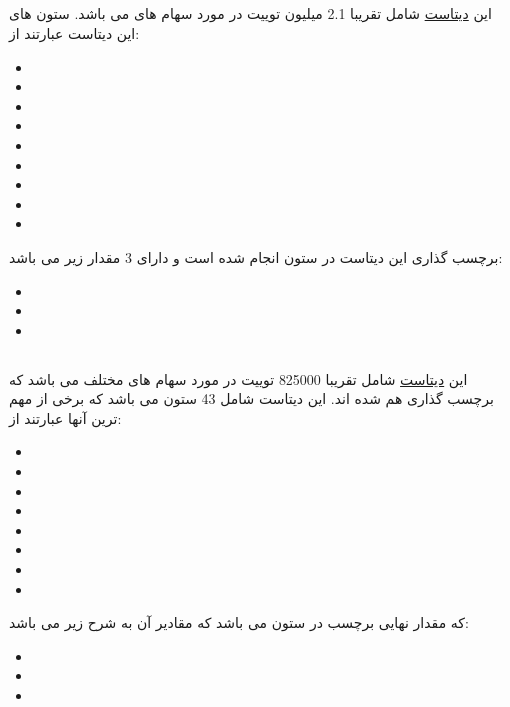 {	\subsection{}
	{
		این \href{https://www.kaggle.com/datasets/andreaskonradsen/stocks-with-sentiment-and-emotion-analysis}{دیتاست} 
		شامل تقریبا 2.1 میلیون توییت در مورد سهام های 
		می باشد.
		\newline ستون های این دیتاست عبارتند از:
		\begin{itemize}
			\item {}
			\item {}
			\item {}
			\item {}
			\item {}
			\item {}
			\item {}
			\item {}
			\item {}
		\end{itemize}
		برچسب گذاری این دیتاست در ستون 
		انجام شده است و دارای 3 مقدار زیر می باشد:
		\begin{itemize}
			\item {}
			\item {}
			\item {}
		\end{itemize}
	}
	
	\subsection{}
	{
		این \href{https://www.kaggle.com/datasets/fabioturazzi/cryptocurrency-tweets-with-sentiment-analysis}{دیتاست} 
		شامل تقریبا 825000 توییت در مورد سهام های مختلف می باشد که برچسب گذاری هم شده اند. این دیتاست شامل 43 ستون می باشد که برخی از مهم ترین آنها عبارتند از:
		\begin{itemize}
			\item {}
			\item {}
			\item {}
			\item {}
			\item {}
			\item {}
			\item {}
			\item {}
		\end{itemize}
		که مقدار نهایی برچسب در ستون 
		می باشد که مقادیر آن به شرح زیر می باشد:
		\begin{itemize}
			\item {}
			\item {}
			\item {}
		\end{itemize}
		
	}
}